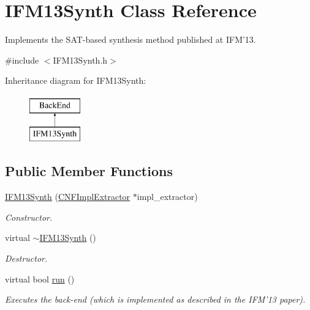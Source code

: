 \hypertarget{classIFM13Synth}{\section{I\-F\-M13\-Synth Class Reference}
\label{classIFM13Synth}
}


Implements the S\-A\-T-\/based synthesis method published at I\-F\-M'13.  




{\ttfamily \#include $<$I\-F\-M13\-Synth.\-h$>$}

Inheritance diagram for I\-F\-M13\-Synth\-:\begin{figure}[H]
\begin{center}
\leavevmode
\includegraphics[height=2.000000cm]{classIFM13Synth}
\end{center}
\end{figure}
\subsection*{Public Member Functions}
\begin{DoxyCompactItemize}
\item 
\hyperlink{classIFM13Synth_ae01ff6a7fb118c2ebdc04818ef59726b}{I\-F\-M13\-Synth} (\hyperlink{classCNFImplExtractor}{C\-N\-F\-Impl\-Extractor} $\ast$impl\-\_\-extractor)
\begin{DoxyCompactList}\small\item\em Constructor. \end{DoxyCompactList}\item 
virtual \hyperlink{classIFM13Synth_ad042200b1639e702af49e55088a52f52}{$\sim$\-I\-F\-M13\-Synth} ()
\begin{DoxyCompactList}\small\item\em Destructor. \end{DoxyCompactList}\item 
virtual bool \hyperlink{classIFM13Synth_a42adb4f76d88199d92b1bedb58a139f8}{run} ()
\begin{DoxyCompactList}\small\item\em Executes the back-\/end (which is implemented as described in the I\-F\-M'13 paper). \end{DoxyCompactList}\end{DoxyCompactItemize}
